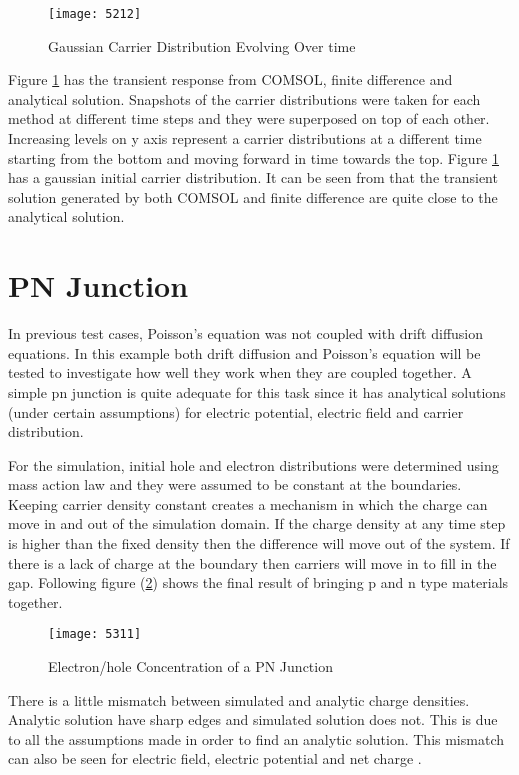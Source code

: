 \begin{doublespace}
\begin{figure}[ht]
\centering
\texttt{[image: 5212]}
\caption{Gaussian Carrier Distribution Evolving Over time} 
\label{51}
\end{figure}

Figure \ref{51} has the transient response from COMSOL, finite difference and analytical solution. Snapshots of the carrier distributions were taken for each method at different time steps and they were superposed on top of each other. Increasing levels on y axis represent a carrier distributions at a different time starting from the bottom and moving forward in time towards the top. Figure \ref{51} has a gaussian initial carrier distribution. It can be seen from that the transient solution generated by both COMSOL and finite difference are quite close to the analytical solution.


\clearpage
\section{PN Junction}
In previous test cases, Poisson's equation was not coupled with drift diffusion equations. In this example both drift diffusion and Poisson's equation will be tested to investigate how well they work when they are coupled together. A simple pn junction is quite adequate for this task since it has analytical solutions (under certain assumptions) for electric potential, electric field and carrier distribution.

For the simulation, initial hole and electron distributions were determined using mass action law and they were assumed to be constant at the boundaries. Keeping carrier density constant creates a mechanism in which the charge can move in and out of the simulation domain. If the charge density at any time step is higher than the fixed density then the difference will move out of the system. If there is a lack of charge at the boundary then carriers will move in to fill in the gap. Following figure (\ref{npcon}) shows the final result of bringing p and n type materials together. 
 
\begin{figure}[ht]
\centering
\texttt{[image: 5311]}
\caption{Electron/hole Concentration of a PN Junction} 
\label{npcon}
\end{figure}

There is a little mismatch between simulated and analytic charge densities. Analytic solution have sharp edges and simulated solution does not. This is due to all the assumptions made in order to find an analytic solution. This mismatch can also be seen for electric field, electric potential and net charge .


\end{doublespace}
